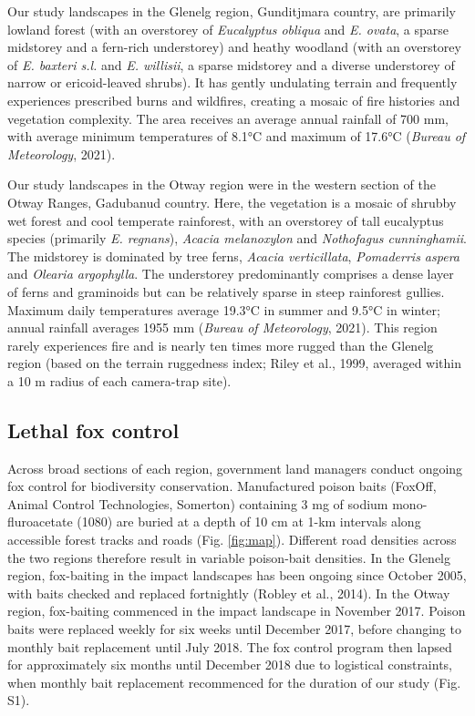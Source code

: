 \documentclass[]{elsarticle} %
\begin{document}
Our study landscapes in the Glenelg region, Gunditjmara country, are primarily lowland forest (with an overstorey of \emph{Eucalyptus obliqua} and \emph{E. ovata}, a sparse midstorey and a fern-rich understorey) and heathy woodland (with an overstorey of \emph{E. baxteri s.l.} and \emph{E. willisii}, a sparse midstorey and a diverse understorey of narrow or ericoid-leaved shrubs). It has gently undulating terrain and frequently experiences prescribed burns and wildfires, creating a mosaic of fire histories and vegetation complexity. The area receives an average annual rainfall of 700 mm, with average minimum temperatures of 8.1°C and maximum of 17.6°C (\emph{Bureau of Meteorology}, 2021).

Our study landscapes in the Otway region were in the western section of the Otway Ranges, Gadubanud country. Here, the vegetation is a mosaic of shrubby wet forest and cool temperate rainforest, with an overstorey of tall eucalyptus species (primarily \emph{E. regnans}), \emph{Acacia melanoxylon} and \emph{Nothofagus cunninghamii}. The midstorey is dominated by tree ferns, \emph{Acacia verticillata}, \emph{Pomaderris aspera} and \emph{Olearia argophylla}.
The understorey predominantly comprises a dense layer of ferns and graminoids but can be relatively sparse in steep rainforest gullies. Maximum daily temperatures average 19.3°C in summer and 9.5°C in winter; annual rainfall averages 1955 mm (\emph{Bureau of Meteorology}, 2021). This region rarely experiences fire and is nearly ten times more rugged than the Glenelg region (based on the terrain ruggedness index; Riley et al., 1999, averaged within a 10 m radius of each camera-trap site).

\hypertarget{lethal-fox-control}{%
\subsection{Lethal fox control}\label{lethal-fox-control}}

Across broad sections of each region, government land managers conduct ongoing fox control for biodiversity conservation.
Manufactured poison baits (FoxOff, Animal Control Technologies, Somerton) containing 3 mg of sodium mono-fluroacetate (1080) are buried at a depth of 10 cm at 1-km intervals along accessible forest tracks and roads (Fig. \ref{fig:map}). Different road densities across the two regions therefore result in variable poison-bait densities. In the Glenelg region, fox-baiting in the impact landscapes has been ongoing since October 2005, with baits checked and replaced fortnightly (Robley et al., 2014). In the Otway region, fox-baiting commenced in the impact landscape in November 2017. Poison baits were replaced weekly for six weeks until December 2017, before changing to monthly bait replacement until July 2018. The fox control program then lapsed for approximately six months until December 2018 due to logistical constraints, when monthly bait replacement recommenced for the duration of our study (Fig. S1).
\end{document}

